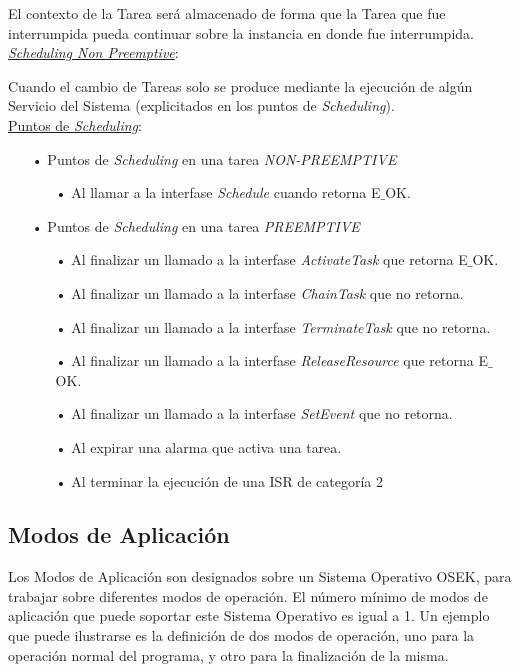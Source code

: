 \documentclass[12pt,letterpaper]{article}
\begin{document}
El contexto de la Tarea será almacenado de forma que la Tarea que fue interrumpida pueda continuar sobre la instancia en donde fue interrumpida.\\
\underline{\textit{Scheduling Non Preemptive}}:

Cuando el cambio de Tareas solo se produce mediante la ejecución de algún Servicio del Sistema (explicitados en los puntos de \textit{Scheduling}).\\
\underline{Puntos de \textit{Scheduling}}:

\begin{enumerate}
\item[•]Puntos de \textit{Scheduling} en una tarea \textit{NON-PREEMPTIVE}
\begin{enumerate}
\item[•]Al llamar a la interfase \textit{Schedule} cuando retorna E$\_$OK.
\end{enumerate}
\item[•]Puntos de \textit{Scheduling} en una tarea \textit{PREEMPTIVE}
\begin{enumerate}
\item[•]Al finalizar un llamado a la interfase \textit{ActivateTask} que retorna E$\_$OK.
\item[•]Al finalizar un llamado a la interfase \textit{ChainTask} que no retorna.
\item[•]Al finalizar un llamado a la interfase \textit{TerminateTask} que no retorna.
\item[•]Al finalizar un llamado a la interfase \textit{ReleaseResource} que retorna E$\_$OK.
\item[•]Al finalizar un llamado a la interfase \textit{SetEvent} que no retorna.
\item[•]Al expirar una alarma que activa una tarea.
\item[•]Al terminar la ejecución de una ISR de categoría 2
\end{enumerate}
\end{enumerate} 

\subsection{Modos de Aplicación}
Los Modos de Aplicación son designados sobre un Sistema Operativo OSEK, para trabajar sobre diferentes modos de operación. El número mínimo de modos de aplicación que puede soportar este Sistema Operativo es igual a 1. Un ejemplo que puede ilustrarse es la definición de dos modos de operación, uno para la operación normal del programa, y otro para la finalización de la misma.
\end{document}
